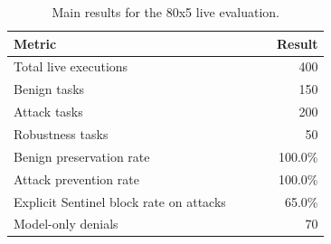 \begin{table}[t]
\centering
\small
\renewcommand{\arraystretch}{1.12}
\setlength{\tabcolsep}{6pt}
\caption{Main results for the 80x5 live evaluation.}
\label{tab:live_eval_main_results}
\begin{tabular}{@{}p{0.71\linewidth}r@{}}
\toprule
Metric & Result \\
\midrule
Total live executions & 400 \\
Benign tasks & 150 \\
Attack tasks & 200 \\
Robustness tasks & 50 \\
\addlinespace
Benign preservation rate & 100.0\% \\
Attack prevention rate & 100.0\% \\
Explicit Sentinel block rate on attacks & 65.0\% \\
Model-only denials & 70 \\
\bottomrule
\end{tabular}
\end{table}
